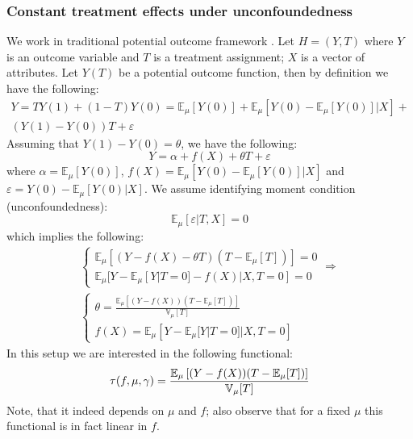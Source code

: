 \documentclass[12pt]{article}
\theoremstyle{plain}
\begin{document}
\subsubsection{Constant treatment effects under unconfoundedness}
We work in traditional potential outcome framework \parencite[see][]{imbens2015causal}. Let $H = (Y,T)$ where $Y$ is an outcome variable and $T$ is a treatment assignment; $X$ is a vector of attributes. Let $Y(T)$ be a potential outcome function, then by definition we have the following:
\begin{multline}
Y = T Y(1) + (1-T) Y(0) = \mathbb{E}_{\mu}[Y(0)] + \mathbb{E}_{\mu}[Y(0)-\mathbb{E}_{\mu}[Y(0)]|X] + \\
\left(Y(1)-Y(0)\right) T + \varepsilon
\end{multline}
Assuming that $Y(1)-Y(0)= \theta$, we have the following:
\begin{equation}
Y = \alpha + f(X) + \theta T + \varepsilon
\end{equation}
where $\alpha = \mathbb{E}_{\mu}[Y(0)]$, $f(X) = \mathbb{E}_{\mu}[Y(0)-\mathbb{E}_{\mu}[Y(0)]|X]$ and $\varepsilon = Y(0) - \mathbb{E}_{\mu}[Y(0)|X]$. We assume identifying moment condition (unconfoundedness):
\begin{equation}
\mathbb{E}_{\mu}[\varepsilon|T,X] = 0
\end{equation}
which implies the following:
\begin{multline}\label{unc_mc}
\begin{cases}
\mathbb{E}_{\mu}[(Y-f(X)-\theta T)(T-\mathbb{E}_{\mu}[T])] = 0\\ 
\mathbb{E}_{\mu}[Y-\mathbb{E}_{\mu}[Y|T=0]-f(X)|X, T=0]=0
\end{cases} \Rightarrow\\
\begin{cases}
\theta = \frac{\mathbb{E}_{\mu}\left[(Y-f(X))(T-\mathbb{E}_{\mu}[T])\right]}{\mathbb{V}_{\mu}[T]} \\
f(X) = \mathbb{E}_{\mu}\left[Y-\mathbb{E}_{\mu}[Y|T=0]|X, T=0\right]
\end{cases}
\end{multline}
In this setup we are interested in the following functional:
\begin{equation}\label{unc}
\tau(f,\mu,\gamma) = \frac{\mathbb{E}_{\mu}\left[(Y-f(X))(T-\mathbb{E}_{\mu}[T])\right]}{\mathbb{V}_{\mu}[T]} \\
\end{equation}
Note, that it indeed depends on $\mu$ and $f$; also observe that for a fixed $\mu$ this functional is in fact linear in $f$.
\end{document}

